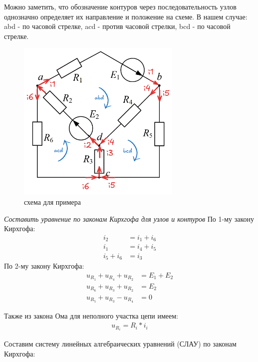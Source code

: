 Можно заметить, что обозначение контуров через последовательность узлов однозначно определяет их направление и положение на схеме.
В нашем случае:
abd - по часовой стрелке, 
acd - против часовой стрелки, 
bcd - по часовой стрелке.



\begin{figure}[H]
    \centering
    \includegraphics[width=0.7\textwidth]{images/Klaws_kontours_nodes.png}
    \caption{схема для примера}
    \label{fig:example}
\end{figure}



\textit{Составить уравнение по законам Кирхгофа для узлов и контуров}
По 1-му закону Кирхгофа:
\begin{align}
    i_2 &= i_1 + i_6 \tag{a} \\
    i_1 &= i_4 + i_5 \tag{b} \\
    i_5 + i_6 &= i_3 \tag{c}
\end{align}
По 2-му закону Кирхгофа:
\begin{align}
    u_{R_1} + u_{R_4} + u_{R_2} &= E_1+E_2 \tag{abd} \\
    u_{R_6} + u_{R_3} + u_{R_2} &= E_2 \tag{acd} \\
    u_{R_5} + u_{R_3} - u_{R_4} &= 0 \tag{bcd}
\end{align}

Также из закона Ома для неполного участка цепи имеем:
\begin{align}
    u_{R_i} = R_i * i_i
\end{align}

Составим систему линейных алгебраических уравнений (СЛАУ) по законам Кирхгофа:

